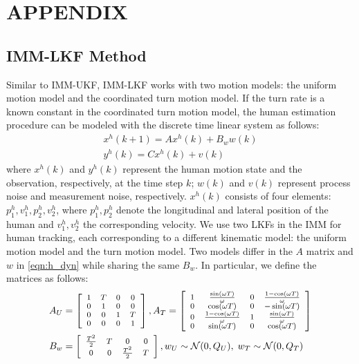 \documentclass[letterpaper, 10 pt, conference]{ieeeconf}
\begin{document}
	
	\section*{APPENDIX}
	\subsection{IMM-LKF Method}
	Similar to IMM-UKF, IMM-LKF works with two motion models: the uniform motion model and the coordinated turn motion model. If the turn rate is a known constant in the coordinated turn motion model, the human estimation procedure can be modeled with the discrete time linear system as follows:
	\small	\begin{subequations}
		\begin{align}
			x^h(k+1) = Ax^h(k)+B_ww(k)\label{eqn:h_dyn}\\
			y^h(k)=Cx^h(k)+v(k)\label{eqn:observation}
		\end{align}
	\end{subequations}
	\normalsize
	where $x^h(k)$ and $y^h(k)$ represent the human motion state and the observation, respectively, at the time step $k$; $w(k)$ and $v(k)$ represent process noise and measurement noise, respectively.
	$x^h(k)$ consists of four elements: $p^h_1,v^h_1,p^h_2,v^h_2$, where $p^h_1,p^h_2$ denote the longitudinal and lateral position of the human and $v^h_1,v^h_2$ the corresponding velocity.
	We use two LKFs in the IMM for human tracking, each corresponding to a different kinematic model: the uniform motion model and the turn motion model.
	Two models differ in the $A$ matrix and $w$ in \cref{eqn:h_dyn} while sharing the same $B_w$.
	In particular, we define the matrices as follows:
	\small\begin{subequations}
		\begin{align*}
			A_U&=\left[
			\scriptsize\begin{array}{cccc}
				1& T& 0& 0\\
				0& 1& 0& 0\\
				0& 0& 1& T\\
				0& 0& 0& 1
			\end{array}\right],
			A_T=\left[
			\scriptsize\begin{array}{cccc}
				1& \frac{\sin(\omega T)}{\omega}& 0& \frac{1-\cos(\omega T)}{\omega}\\
				0& \cos(\omega T)& 0& -\sin(\omega T)\\
				0& \frac{1-\cos(\omega T)}{\omega}& 1& \frac{\sin(\omega T)}{\omega}\\
				0& \sin(\omega T)& 0& \cos(\omega T)
			\end{array}\right]\\
			B_w&=\left[
			\scriptsize\begin{array}{cccc}
				\frac{T^2}{2}& T& 0& 0\\
				0& 0& \frac{T^2}{2}& T
			\end{array}\right],
			w_U\sim\mathcal{N}(0,Q_U),\; w_T\sim\mathcal{N}(0,Q_T)
		\end{align*}
	\end{subequations}\normalsize
\end{document}
